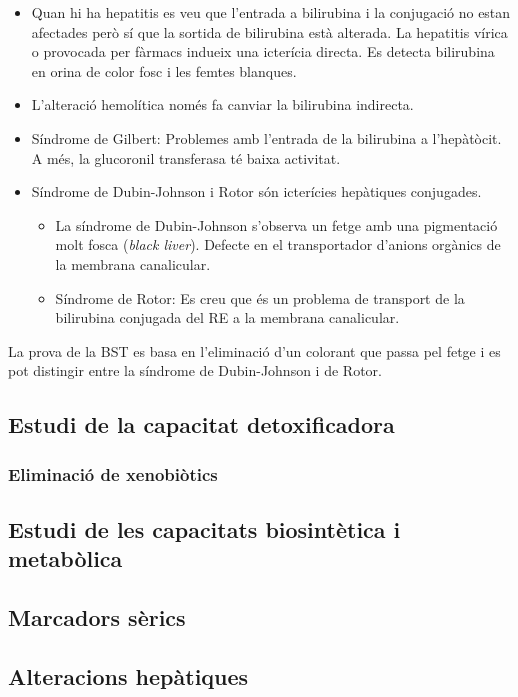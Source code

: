 \begin{itemize}
\item Quan hi ha hepatitis es veu que l'entrada a bilirubina i la conjugació
no estan afectades però sí que la sortida de bilirubina està
alterada. La hepatitis vírica o provocada per fàrmacs indueix una
icterícia directa. Es detecta bilirubina en orina de color fosc i les
femtes blanques.

\item L'alteració hemolítica només fa canviar la bilirubina indirecta.

\item Síndrome de Gilbert: Problemes amb l'entrada de la bilirubina a
  l'hepàtòcit. A més, la glucoronil transferasa té baixa activitat.

\item Síndrome de Dubin-Johnson i Rotor són icterícies hepàtiques
  conjugades. 
  \begin{itemize}
  \item La síndrome de Dubin-Johnson s'observa un fetge amb una
  pigmentació molt fosca (\textit{black liver}). Defecte en el
  transportador d'anions orgànics de la membrana canalicular.
\item Síndrome de Rotor: Es creu que és un problema de transport de la
  bilirubina conjugada del RE a la membrana canalicular.
  \end{itemize}

\end{itemize}

La prova de la BST es basa en l'eliminació d'un colorant que passa pel
fetge i es pot distingir entre la síndrome de Dubin-Johnson i de Rotor.

\subsection{Estudi de la capacitat detoxificadora}
\label{sec:estudi-de-la-1}

\subsubsection{Eliminació de xenobiòtics}
\label{sec:elim-de-xenob}


\subsection{Estudi de les capacitats biosintètica i metabòlica}
\label{sec:estudi-de-les}


\subsection{Marcadors sèrics}
\label{sec:marcadors-serics}


\subsection{Alteracions hepàtiques}
\label{sec:alter-hepat}

